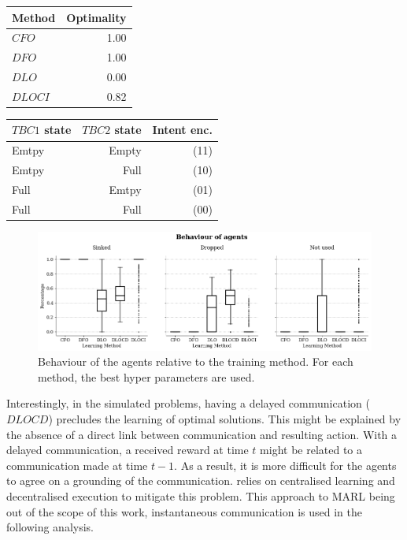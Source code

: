 \begin{tabular}{lr}
\toprule
Method         &  Optimality      \\
\midrule
$CFO$  & 1.00 \\
$DFO$  & 1.00 \\
$DLO$  & 0.00 \\
$DLOCI$ & 0.82 \\
\bottomrule
\end{tabular}


\begin{tabular}{lrr}
\toprule
$TBC1$ state & $TBC2$ state & Intent enc.\\
\midrule
Emtpy & Empty & (11)  \\
Emtpy & Full &  (10) \\
Full & Emtpy & (01) \\
Full & Full & (00) \\
\bottomrule
\end{tabular}



\begin{figure}[ht]
\centering
\includegraphics[width=\textwidth]{imgs/exp-0-comparision-fo-lo.png}
\caption[Behaviour of agents relative to training method]{Behaviour of the agents relative to the training method. For each method, the best hyper parameters are used\protect\footnotemark.}
\label{fig:exp-0-comparision}
\end{figure}


Interestingly, in the simulated problems, having a delayed communication ($DLOCD$) precludes the learning of optimal solutions. This might be explained by the absence of a direct link between communication and resulting action. With a delayed communication, a received reward at time $t$ might be related to a communication made at time $t-1$. As a result, it is more difficult for the agents to agree on a grounding of the communication. \cite{foerster_learning_2016} relies on centralised learning and decentralised execution to mitigate this problem. This approach to MARL being out of the scope of this work, instantaneous communication is used in the following analysis.


